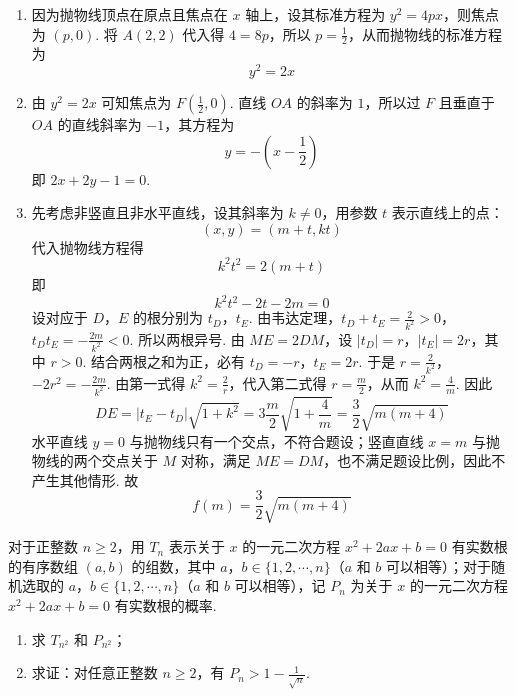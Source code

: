 \begin{solution}
\begin{enumerate}
\item 因为抛物线顶点在原点且焦点在 \(x\) 轴上，设其标准方程为 \(y^2=4px\)，则焦点为 \((p,0)\). 将 \(A(2,2)\) 代入得 \(4=8p\)，所以 \(p=\frac12\)，从而抛物线的标准方程为
\[
y^2=2x
\]

\item 由 \(y^2=2x\) 可知焦点为 \(F\left(\frac12,0\right)\). 直线 \(OA\) 的斜率为 \(1\)，所以过 \(F\) 且垂直于 \(OA\) 的直线斜率为 \(-1\)，其方程为
\[
y=-\left(x-\frac12\right)
\]
即 \(2x+2y-1=0\).

\item 先考虑非竖直且非水平直线，设其斜率为 \(k\ne0\)，用参数 \(t\) 表示直线上的点：
\[
(x,y)=(m+t,kt)
\]
代入抛物线方程得
\[
k^2t^2=2(m+t)
\]
即
\[
k^2t^2-2t-2m=0
\]
设对应于 \(D\)，\(E\) 的根分别为 \(t_D\)，\(t_E\). 由韦达定理，\(t_D+t_E=\frac2{k^2}>0\)，\(t_Dt_E=-\frac{2m}{k^2}<0\).
所以两根异号. 由 \(ME=2DM\)，设 \(|t_D|=r\)，\(|t_E|=2r\)，其中 \(r>0\). 结合两根之和为正，必有 \(t_D=-r\)，\(t_E=2r\). 于是 \(r=\frac2{k^2}\)，\(-2r^2=-\frac{2m}{k^2}\).
由第一式得 \(k^2=\frac{2}{r}\)，代入第二式得 \(r=\frac{m}{2}\)，从而 \(k^2=\frac{4}{m}\). 因此
\[
DE=|t_E-t_D|\sqrt{1+k^2}
=3\frac m2\sqrt{1+\frac4m}
=\frac32\sqrt{m(m+4)}
\]
水平直线 \(y=0\) 与抛物线只有一个交点，不符合题设；竖直直线 \(x=m\) 与抛物线的两个交点关于 \(M\) 对称，满足 \(ME=DM\)，也不满足题设比例，因此不产生其他情形. 故
\[
f(m)=\frac32\sqrt{m(m+4)}
\]
\end{enumerate}
\end{solution}

\begin{problem}
对于正整数 \(n\ge2\)，用 \(T_n\) 表示关于 \(x\) 的一元二次方程 \(x^2+2ax+b=0\) 有实数根的有序数组 \((a,b)\) 的组数，其中 \(a\)，\(b\in\{1,2,\cdots,n\}\)（\(a\) 和 \(b\) 可以相等）；对于随机选取的 \(a\)，\(b\in\{1,2,\cdots,n\}\)（\(a\) 和 \(b\) 可以相等），记 \(P_n\) 为关于 \(x\) 的一元二次方程 \(x^2+2ax+b=0\) 有实数根的概率.

\begin{enumerate}
\item 求 \(T_{n^2}\) 和 \(P_{n^2}\)；
\item 求证：对任意正整数 \(n\ge2\)，有 \(P_n>1-\frac{1}{\sqrt n}\).
\end{enumerate}
\end{problem}

